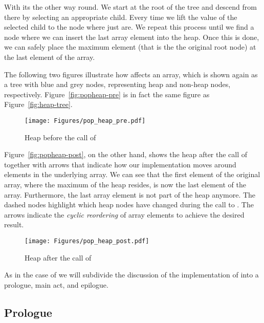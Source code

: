 With \popheap its the other way round.
We start at the root of the tree and descend from there
by selecting an appropriate child.
Every time we lift the value of the selected child to the node where
just are.
We repeat this process until we find a node where we can insert
the last array element into the heap.
Once this is done, we can safely place the maximum element (that is the
the original root node) at the last element of the array.

\clearpage

The following two figures illustrate how \popheap affects an array,
which is shown again as a tree with blue and grey nodes, representing
heap and non-heap nodes, respectively.
Figure~\ref{fig:popheap-pre} is in fact the same figure as
Figure~\ref{fig:heap-tree}.

\begin{figure}[hbt]
\centering
\texttt{[image: Figures/pop\_heap\_pre.pdf]}
\caption{Heap before the call of \popheap}
\end{figure}

\FloatBarrier

Figure~\ref{fig:popheap-post}, on the other hand, shows the heap after the call of \popheap
together with arrows that indicate how our implementation moves around elements
in the underlying array.
We can see that the first element of the original array,
where the maximum of the heap resides, is now the last element of the array.
Furthermore, the last array element is not part of the heap anymore.
The dashed nodes highlight which heap nodes have changed during the call to \popheap.
The arrows indicate the \emph{cyclic reordering} of array elements to achieve the
desired result.

\begin{figure}[hbt]
\centering
\texttt{[image: Figures/pop\_heap\_post.pdf]}
\caption{Heap after the call of \popheap}
\end{figure}

\FloatBarrier


As in the case of  we will subdivide the discussion of the 
implementation of  into a prologue, main act, and epilogue.




\subsection{Prologue}

